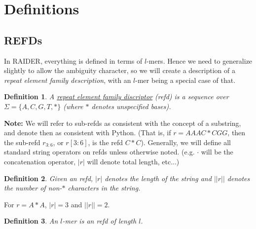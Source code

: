 \documentclass{article}
\newtheorem{definition}{Definition}
\begin{document}
\section{Definitions}

\subsection{REFDs}
In RAIDER, everything is defined in terms of $l$-mers.  Hence we need
to generalize slightly to allow the ambiguity character, so we will
create a description of a {\it repeat element family description},
with an $l$-mer being a special case of that.

\begin{definition}
A \underline{repeat element family discriptor} (refd) is a sequence over
$\Sigma=\{A,C,G,T,*\}$ (where $*$ denotes unspecified bases).
\end{definition}

{\bf Note:} We will refer to sub-refds as consistent with the concept
of a substring, and denote then as consistent with Python.  (That is,
if $r =  AAAC*CGG$, then the sub-refd $r_{3:6}$, or $r[3:6]$, is the refd
$C*C$).  Generally, we will define all standard string operators on
refds unless otherwise noted.  (e.g. $\cdot$ will be the concatenation
operator, $|r|$ will denote total length, etc...)

\begin{definition}
Given an refd, $|r|$ denotes the length of the string and $||r||$
denotes the number of non-$*$ characters in the string.
\end{definition}
For $r = A*A$, $|r| = 3$ and $||r|| = 2$.

\begin{definition}
An $l$-mer is an refd of length $l$.
\end{definition}
\end{document}
